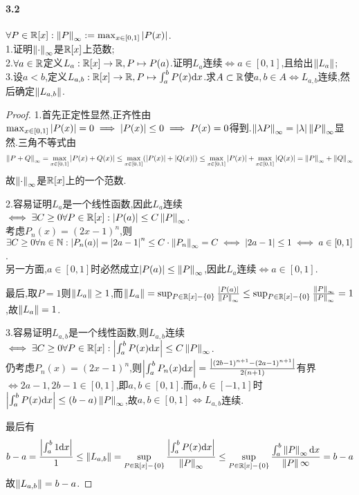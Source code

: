 \documentclass[UTF8]{article}
\begin{document}
\paragraph*{3.2}$\forall P\in \mathbb{R}[x]:\left\|P\right\|_\infty:=\max_{x\in [0,1]}\left|P(x)\right|$.\\
1.证明$\left\|\cdot\right\|_\infty$是$\mathbb{R}[x]$上范数;\\
2.$\forall a\in \mathbb{R}$定义$L_a:\mathbb{R}[x]\to \mathbb{R}, P\mapsto P(a)$.证明$L_a$连续$\iff a\in [0,1]$,且给出$\left\|L_a\right\|$;\\
3.设$a<b$,定义$L_{a,b}:\mathbb{R}[x]\to \mathbb{R}, P\mapsto \int_a^b P(x)\mathrm{d} x$.求$A\subset \mathbb{R}$使$a,b\in A\iff L_{a,b}$连续,然后确定$\left\|L_{a,b}\right\|$.
\begin{proof}
    1.首先正定性显然,正齐性由$\max_{x\in [0,1]}\left|P(x)\right|=0\implies \left|P(x)\right|\leq 0\implies P(x)=0$得到.$\left\|\lambda P\right\|_\infty=\left|\lambda\right|\left\|P\right\|_\infty$显然.三角不等式由$$\left\|P+Q\right\|_\infty=\max_{x\in [0,1]}\left|P(x)+Q(x)\right|\leq \max_{x\in [0,1]}\!\left(\left|P(x)\right|+\left|Q(x)\right|\right)\leq \max_{x\in [0,1]}\left|P(x)\right|+\max_{x\in [0,1]}\left|Q(x)\right|=\left\|P\right\|_\infty+\left\|Q\right\|_\infty$$
    故$\left\|\cdot\right\|_\infty$是$\mathbb{R}[x]$上的一个范数.

    2.容易证明$L_a$是一个线性函数,因此$L_a$连续$\iff \exists C\geq 0\forall P\in \mathbb{R}[x]:\left|P(a)\right|\leq C\left\|P\right\|_\infty$.\\ 考虑$P_n(x)=(2x-1)^n$,则$\exists C\geq 0\forall n\in \mathbb{N}:\left|P_n(a)\right|=\left|2a-1\right|^n\leq C\cdot \left\|P_n\right\|_\infty=C\iff \left|2a-1\right|\leq 1\iff a\in [0,1]$.\\ 另一方面,$a\in [0,1]$时必然成立$\left|P(a)\right|\leq \left\|P\right\|_\infty$,因此$L_a$连续$\iff a\in [0,1]$.

    最后,取$P=1$则$\left\|L_a\right\|\geq 1$,而$\left\|L_a\right\|=\sup_{P\in \mathbb{R}[x]-\left\{0\right\}}\frac{\left|P(a)\right|}{\left\|P\right\|_\infty}\leq \sup_{P\in \mathbb{R}[x]-\left\{0\right\}}\frac{\left\|P\right\|_\infty}{\left\|P\right\|_\infty}=1$,故$\left\|L_a\right\|=1$.

    3.容易证明$L_{a,b}$是一个线性函数,则$L_{a,b}$连续$\iff \exists C\geq 0\forall P\in \mathbb{R}[x]:\left|\int_a^b P(x)\mathrm{d} x\right|\leq C\left\|P\right\|_\infty$.\\
    仍考虑$P_n(x)=(2x-1)^n$,则$\left|\int_a^b P_n(x)\mathrm{d} x\right|=\frac{\left|(2b-1)^{n+1}-(2a-1)^{n+1}\right|}{2(n+1)}$有界$\iff 2a-1,2b-1\in [0,1]$,即$a,b\in [0,1]$.而$a,b\in [-1,1]$时$\left|\int_a^b P(x)\mathrm{d} x\right|\leq (b-a)\left\|P\right\|_\infty$,故$a,b\in [0,1]\iff L_{a,b}$连续.

    最后有$$b-a=\frac{\left|\int_a^b 1 \mathrm{d} x\right|}{1}\leq\left\|L_{a,b}\right\|=\sup_{P\in \mathbb{R}[x]-\left\{0\right\}}\frac{\left|\int_a^bP(x)\mathrm{d} x\right|}{\left\|P\right\|_\infty}\leq \sup_{P\in \mathbb{R}[x]-\left\{0\right\}}\frac{\int_a^b\left\|P\right\|_\infty\mathrm{d} x}{\left\|P\right\|\infty}=b-a$$故$\left\|L_{a,b}\right\|=b-a$.
\end{proof}
\end{document}
